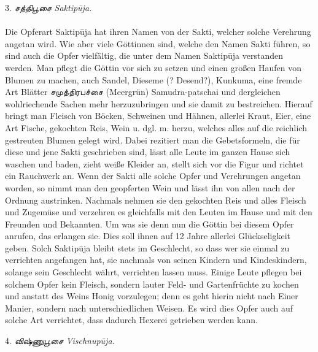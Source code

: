 \documentclass{article}
\newcommand{\TamilText}[1]{\texttamil{#1}}
\newcommand{\tam}[1]{\TamilText{#1}}
\begin{document}
\begin{center}
3. \emph{\tam{சத்திபூசை} Saktip\={u}ja.}
\end{center}
\paragraph{}
Die Opferart Saktip\={u}ja hat ihren Namen von der Sakti, welcher solche Verehrung angetan wird. Wie aber viele Göttinnen sind, welche den Namen Sakti führen, so sind auch die Opfer vielfältig, die unter dem Namen Saktip\={u}ja verstanden werden. Man pflegt die Göttin vor sich zu setzen und einen großen Haufen von Blumen zu machen, auch Sandel, Dieseme (? Desend?), Kunkuma, eine fremde Art Blätter \tam{சமுத்திரபச்சை} (Meergrün) Samudra-patschai und dergleichen wohlriechende Sachen mehr herzuzubringen und sie damit zu bestreichen. Hierauf bringt man Fleisch von Böcken, Schweinen und Hähnen, allerlei Kraut, Eier, eine Art Fische, gekochten Reis, Wein u. dgl. m. herzu, welches alles auf die reichlich gestreuten Blumen gelegt wird. Dabei rezitiert man die Gebetsformeln, die für diese und jene Sakti geschrieben sind, lässt alle Leute im ganzen Hause sich waschen und baden, zieht weiße Kleider an, stellt sich vor die Figur und richtet ein Rauchwerk an. Wenn der Sakti alle solche Opfer und Verehrungen angetan worden, so nimmt man den geopferten Wein und lässt ihn von allen nach der Ordnung austrinken. Nachmals nehmen sie den gekochten Reis und alles Fleisch und Zugemüse und verzehren es gleichfalls mit den Leuten im Hause und mit den Freunden und Bekannten. Um was sie denn nun die Göttin bei diesem Opfer anrufen, das erlangen sie. Dies soll ihnen auf 12 Jahre allerlei Glückseligkeit geben. Solch Saktip\={u}ja bleibt stets im Geschlecht, so dass wer sie einmal zu verrichten angefangen hat, sie nachmals von seinen Kindern und Kindeskindern, solange sein Geschlecht währt, verrichten lassen muss. Einige Leute pflegen bei solchem Opfer kein Fleisch, sondern lauter Feld- und Gartenfrüchte zu kochen und anstatt des Weins Honig vorzulegen; denn es geht hierin nicht nach Einer Manier, sondern nach unterschiedlichen Weisen. Es wird dies Opfer auch auf solche Art verrichtet, dass dadurch Hexerei getrieben werden kann.

\begin{center}
4. \emph{\tam{விஷ்ணுபூசை} Vischnup\={u}ja.}
\end{center}
\end{document}
